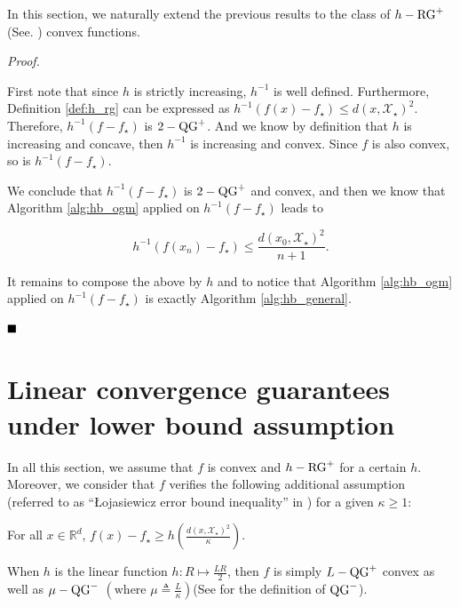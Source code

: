 In this section, we naturally extend the previous results to the class of $h-\operatorname{RG}^+$ (See. ) convex functions.

\hbgeneral*

\noindent \textit{Proof.}
    
    First note that since $h$ is strictly increasing, $h^{-1}$ is well defined.
    Furthermore, Definition \ref{def:h_rg} can be expressed as
    $h^{-1}\left(f(x)-f_\star\right) \leq d(x, \mathcal{X}_\star)^2.$
    Therefore, $h^{-1}\left(f-f_\star\right)$ is $2-\operatorname{QG}^+$.
    And we know by definition that $h$ is increasing and concave, then $h^{-1}$ is increasing and convex.
    Since $f$ is also convex, so is $h^{-1}\left(f-f_\star\right)$.
    
    We conclude that $h^{-1}\left(f-f_\star\right)$ is $2-\operatorname{QG}^+$ and convex, and then we know that Algorithm \ref{alg:hb_ogm} applied on $h^{-1}\left(f-f_\star\right)$ leads to
    
    \begin{equation*}
        h^{-1}\left(f(x_n) - f_\star\right) \leq \frac{d(x_0, \mathcal{X}_\star)^2}{n+1}.
    \end{equation*}
    
    It remains to compose the above by $h$ and to notice that Algorithm \ref{alg:hb_ogm} applied on $h^{-1}\left(f-f_\star\right)$ is exactly Algorithm \ref{alg:hb_general}.
    
$\hfill\blacksquare$


\section{Linear convergence guarantees under lower bound assumption}
\label{apx:restart}


In all this section, we assume that $f$ is convex and $h-\operatorname{RG}^+$ for a certain $h$. Moreover, we consider that $f$ verifies the following additional assumption (referred to as ``\L{}ojasiewicz error bound inequality'' in \citep{bolte2017error}) for a given $\kappa \geq 1$:

\begin{Assump}
    \label{assump:h_kappa}
    For all $x \in \mathbb{R}^d$, $f(x)-f_\star \geq h\left( \frac{ d(x, \mathcal{X}_\star)^2}{\kappa} \right)$.
\end{Assump}

\begin{Rem}
    When $h$ is the linear function $h: R \mapsto \frac{LR}{2}$, then $f$ is simply $L-\operatorname{QG}^+$ convex as well as $\mu-\operatorname{QG}^-$ $\left(\text{where } \mu \triangleq \frac{L}{\kappa}\right)$(See \citep{guille2021study} for the definition of $\operatorname{QG}^-$).
\end{Rem}


